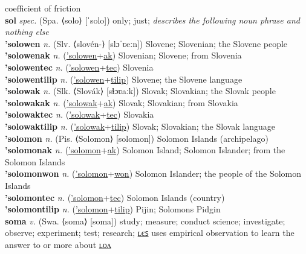 coefficient of friction \label{sapupowinyolyan} \\
\textbf{sol} \textit{spec.} (Spa. ⟨solo⟩ [ˈsolo])
only; just; \textit{describes the following noun phrase and nothing else} \label{sol} \\
\textbf{'solowen} \textit{n.} (Slv. ⟨slovén-⟩ [slɔˈʋeːn])
Slovene; Slovenian; the Slovene people \label{'solowen} \\
\textbf{'solowenak} \textit{n.} (\hyperref['solowen]{'solowen}+\hyperref[ak]{ak})
Slovenian; Slovene; from Slovenia \label{'solowenak} \\
\textbf{'solowentec} \textit{n.} (\hyperref['solowen]{'solowen}+\hyperref[tec]{tec})
Slovenia \label{'solowentec} \\
\textbf{'solowentilip} \textit{n.} (\hyperref['solowen]{'solowen}+\hyperref[tilip]{tilip})
Slovene; the Slovene language \label{'solowentilip} \\
\textbf{'solowak} \textit{n.} (Slk. ⟨Slovák⟩ [sɫɔʋaːk])
Slovak; Slovakian; the Slovak people \label{'solowak} \\
\textbf{'solowakak} \textit{n.} (\hyperref['solowak]{'solowak}+\hyperref[ak]{ak})
Slovak; Slovakian; from Slovakia \label{'solowakak} \\
\textbf{'solowaktec} \textit{n.} (\hyperref['solowak]{'solowak}+\hyperref[tec]{tec})
Slovakia \label{'solowaktec} \\
\textbf{'solowaktilip} \textit{n.} (\hyperref['solowak]{'solowak}+\hyperref[tilip]{tilip})
Slovak; Slovakian; the Slovak language \label{'solowaktilip} \\
\textbf{'solomon} \textit{n.} (Pis. ⟨Solomon⟩ [solomon])
Solomon Islands (archipelago) \label{'solomon} \\
\textbf{'solomonak} \textit{n.} (\hyperref['solomon]{'solomon}+\hyperref[ak]{ak})
Solomon Island; Solomon Islander; from the Solomon Islands \label{'solomonak} \\
\textbf{'solomonwon} \textit{n.} (\hyperref['solomon]{'solomon}+\hyperref[won]{won})
Solomon Islander; the people of the Solomon Islands \label{'solomonwon} \\
\textbf{'solomontec} \textit{n.} (\hyperref['solomon]{'solomon}+\hyperref[tec]{tec})
Solomon Islands (country) \label{'solomontec} \\
\textbf{'solomontilip} \textit{n.} (\hyperref['solomon]{'solomon}+\hyperref[tilip]{tilip})
Pijin; Solomons Pidgin \label{'solomontilip} \\
\textbf{soma} \textit{v.} (Swa. ⟨soma⟩ [soma])
study; measure; conduct science; investigate; observe; experiment; test; research; \hyperref[somales]{ʟєꜱ} uses empirical observation to learn the answer to or more about \hyperref[somalon]{ʟᴏᴧ} \label{soma} \\
